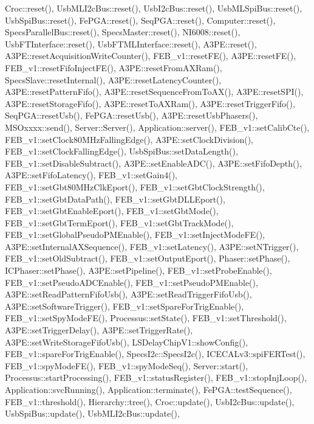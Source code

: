 Croc\+::reset(), Usb\+M\+L\+I2c\+Bus\+::reset(), Usb\+I2c\+Bus\+::reset(), Usb\+M\+L\+Spi\+Bus\+::reset(), Usb\+Spi\+Bus\+::reset(), Fe\+P\+G\+A\+::reset(), Seq\+P\+G\+A\+::reset(), Computer\+::reset(), Specs\+Parallel\+Bus\+::reset(), Specs\+Master\+::reset(), N\+I6008\+::reset(), Usb\+F\+T\+Interface\+::reset(), Usb\+F\+T\+M\+L\+Interface\+::reset(), A3\+P\+E\+::reset(), A3\+P\+E\+::reset\+Acquisition\+Write\+Counter(), F\+E\+B\+\_\+v1\+::reset\+F\+E(), A3\+P\+E\+::reset\+F\+E(), F\+E\+B\+\_\+v1\+::reset\+Fifo\+Inject\+F\+E(), A3\+P\+E\+::reset\+From\+A\+X\+Ram(), Specs\+Slave\+::reset\+Internal(), A3\+P\+E\+::reset\+Latency\+Counter(), A3\+P\+E\+::reset\+Pattern\+Fifo(), A3\+P\+E\+::reset\+Sequence\+From\+To\+A\+X(), A3\+P\+E\+::reset\+S\+P\+I(), A3\+P\+E\+::reset\+Storage\+Fifo(), A3\+P\+E\+::reset\+To\+A\+X\+Ram(), A3\+P\+E\+::reset\+Trigger\+Fifo(), Seq\+P\+G\+A\+::reset\+Usb(), Fe\+P\+G\+A\+::reset\+Usb(), A3\+P\+E\+::reset\+Usb\+Phasers(), M\+S\+Oxxxx\+::send(), Server\+::\+Server(), Application\+::server(), F\+E\+B\+\_\+v1\+::set\+Calib\+Cte(), F\+E\+B\+\_\+v1\+::set\+Clock80\+M\+Hz\+Falling\+Edge(), A3\+P\+E\+::set\+Clock\+Division(), F\+E\+B\+\_\+v1\+::set\+Clock\+Falling\+Edge(), Usb\+Spi\+Bus\+::set\+Data\+Length(), F\+E\+B\+\_\+v1\+::set\+Disable\+Subtract(), A3\+P\+E\+::set\+Enable\+A\+D\+C(), A3\+P\+E\+::set\+Fifo\+Depth(), A3\+P\+E\+::set\+Fifo\+Latency(), F\+E\+B\+\_\+v1\+::set\+Gain4(), F\+E\+B\+\_\+v1\+::set\+Gbt80\+M\+Hz\+Clk\+Eport(), F\+E\+B\+\_\+v1\+::set\+Gbt\+Clock\+Strength(), F\+E\+B\+\_\+v1\+::set\+Gbt\+Data\+Path(), F\+E\+B\+\_\+v1\+::set\+Gbt\+D\+L\+L\+Eport(), F\+E\+B\+\_\+v1\+::set\+Gbt\+Enable\+Eport(), F\+E\+B\+\_\+v1\+::set\+Gbt\+Mode(), F\+E\+B\+\_\+v1\+::set\+Gbt\+Term\+Eport(), F\+E\+B\+\_\+v1\+::set\+Gbt\+Track\+Mode(), F\+E\+B\+\_\+v1\+::set\+Global\+Pseudo\+P\+M\+Enable(), F\+E\+B\+\_\+v1\+::set\+Inject\+Mode\+F\+E(), A3\+P\+E\+::set\+Internal\+A\+X\+Sequence(), F\+E\+B\+\_\+v1\+::set\+Latency(), A3\+P\+E\+::set\+N\+Trigger(), F\+E\+B\+\_\+v1\+::set\+Old\+Subtract(), F\+E\+B\+\_\+v1\+::set\+Output\+Eport(), Phaser\+::set\+Phase(), I\+C\+Phaser\+::set\+Phase(), A3\+P\+E\+::set\+Pipeline(), F\+E\+B\+\_\+v1\+::set\+Probe\+Enable(), F\+E\+B\+\_\+v1\+::set\+Pseudo\+A\+D\+C\+Enable(), F\+E\+B\+\_\+v1\+::set\+Pseudo\+P\+M\+Enable(), A3\+P\+E\+::set\+Read\+Pattern\+Fifo\+Usb(), A3\+P\+E\+::set\+Read\+Trigger\+Fifo\+Usb(), A3\+P\+E\+::set\+Software\+Trigger(), F\+E\+B\+\_\+v1\+::set\+Spare\+For\+Trig\+Enable(), F\+E\+B\+\_\+v1\+::set\+Spy\+Mode\+F\+E(), Processus\+::set\+State(), F\+E\+B\+\_\+v1\+::set\+Threshold(), A3\+P\+E\+::set\+Trigger\+Delay(), A3\+P\+E\+::set\+Trigger\+Rate(), A3\+P\+E\+::set\+Write\+Storage\+Fifo\+Usb(), L\+S\+Delay\+Chip\+V1\+::show\+Config(), F\+E\+B\+\_\+v1\+::spare\+For\+Trig\+Enable(), Specs\+I2c\+::\+Specs\+I2c(), I\+C\+E\+C\+A\+Lv3\+::spi\+F\+E\+R\+Test(), F\+E\+B\+\_\+v1\+::spy\+Mode\+F\+E(), F\+E\+B\+\_\+v1\+::spy\+Mode\+Seq(), Server\+::start(), Processus\+::start\+Processing(), F\+E\+B\+\_\+v1\+::status\+Register(), F\+E\+B\+\_\+v1\+::stop\+Inj\+Loop(), Application\+::svc\+Running(), Application\+::terminate(), Fe\+P\+G\+A\+::test\+Sequence(), F\+E\+B\+\_\+v1\+::threshold(), Hierarchy\+::tree(), Croc\+::update(), Usb\+I2c\+Bus\+::update(), Usb\+Spi\+Bus\+::update(), Usb\+M\+L\+I2c\+Bus\+::update(), 